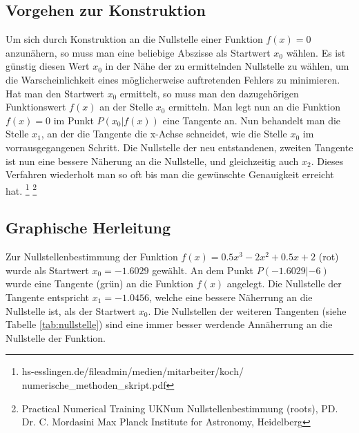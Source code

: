 \documentclass[a4paper,12pt,fleqn,oneside]{article}
\begin{document}
	\subsection{Vorgehen zur Konstruktion}
		Um sich durch Konstruktion an die Nullstelle einer Funktion $f(x) = 0$ anzunähern, so muss man eine beliebige Abszisse als Startwert $x_0$
		wählen. Es ist günstig diesen Wert $x_0$ in der Nähe der zu ermittelnden Nullstelle zu wählen, um die Warscheinlichkeit eines möglicherweise
		auftretenden Fehlers zu minimieren. Hat man den Startwert $x_0$ ermittelt, so muss man den dazugehörigen Funktionswert $f(x)$ an der Stelle
		$x_0$ ermitteln. Man legt nun an die Funktion $f(x) = 0$ im Punkt $P(x_0|f(x))$ eine Tangente an. Nun behandelt man die Stelle $x_1$, an der
		die Tangente die x-Achse schneidet, wie die Stelle $x_0$ im vorrausgegangenen Schritt. Die Nullstelle der neu entstandenen, zweiten Tangente
		ist nun eine bessere Näherung an die Nullstelle, und gleichzeitig auch $x_2$. Dieses Verfahren wiederholt man so oft bis man die gewünschte
		Genauigkeit erreicht hat.
		\footnote{hs-esslingen.de/fileadmin/medien/mitarbeiter/koch/\\numerische\_methoden\_skript.pdf}
		\footnote{Practical Numerical Training UKNum Nullstellenbestimmung (roots), PD. Dr. C. Mordasini Max Planck Institute for Astronomy, Heidelberg}
		
\newpage

	\subsection{Graphische Herleitung}
		Zur Nullstellenbestimmung der Funktion $f(x) = \num{0.5}x^3 - 2x^2 + \num{0.5}x + 2$ (rot) wurde als Startwert $x_0 = \num{-1.6029}$
		gewählt. An dem Punkt $P(\num{-1.6029}|\num{-6})$ wurde eine Tangente (grün) an die Funktion $f(x)$ angelegt. Die Nullstelle der Tangente
		entspricht $x_1 = \num{-1.0456}$, welche eine bessere Näherrung an die Nullstelle ist, als der Startwert $x_0$. Die Nullstellen der weiteren
		Tangenten (siehe Tabelle \ref{tab:nullstelle}) sind eine immer besser werdende Annäherrung an die Nullstelle der Funktion.
		
\end{document}
